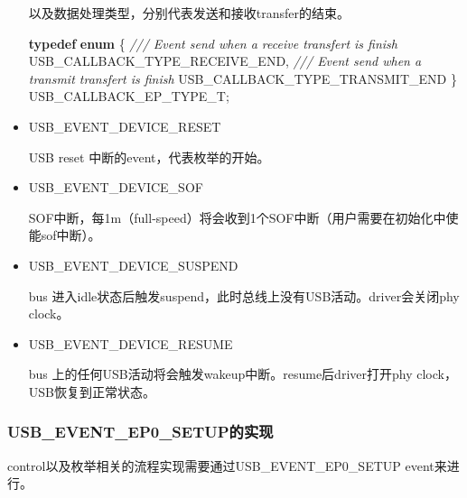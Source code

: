 \documentclass[
  12pt,
]{book}
\newenvironment{Shaded}{\begin{snugshade}}{\end{snugshade}}
\newcommand{\CommentTok}[1]{\textcolor[rgb]{0.56,0.35,0.01}{\textit{#1}}}
\newcommand{\KeywordTok}[1]{\textcolor[rgb]{0.13,0.29,0.53}{\textbf{#1}}}
\newcommand{\NormalTok}[1]{#1}
\begin{document}
\begin{itemize}
  以及数据处理类型，分别代表发送和接收transfer的结束。

\begin{Shaded}
\begin{Highlighting}[]
\KeywordTok{typedef} \KeywordTok{enum}
\NormalTok{\{}
    \CommentTok{/// Event send when a receive transfert is finish}
\NormalTok{    USB_CALLBACK_TYPE_RECEIVE_END,}
    \CommentTok{/// Event send when a transmit transfert is finish}
\NormalTok{    USB_CALLBACK_TYPE_TRANSMIT_END}
\NormalTok{\} USB_CALLBACK_EP_TYPE_T;}
\end{Highlighting}
\end{Shaded}
\item
  USB\_EVENT\_DEVICE\_RESET

  USB reset 中断的event，代表枚举的开始。
\item
  USB\_EVENT\_DEVICE\_SOF

  SOF中断，每1m（full-speed）将会收到1个SOF中断（用户需要在初始化中使能sof中断）。
\item
  USB\_EVENT\_DEVICE\_SUSPEND

  bus 进入idle状态后触发suspend，此时总线上没有USB活动。driver会关闭phy clock。
\item
  USB\_EVENT\_DEVICE\_RESUME

  bus 上的任何USB活动将会触发wakeup中断。resume后driver打开phy clock，USB恢复到正常状态。
\end{itemize}

\hypertarget{usb_event_ep0_setupux7684ux5b9eux73b0}{%
\subsubsection{USB\_EVENT\_EP0\_SETUP的实现}\label{usb_event_ep0_setupux7684ux5b9eux73b0}}

control以及枚举相关的流程实现需要通过USB\_EVENT\_EP0\_SETUP event来进行。
\end{document}
